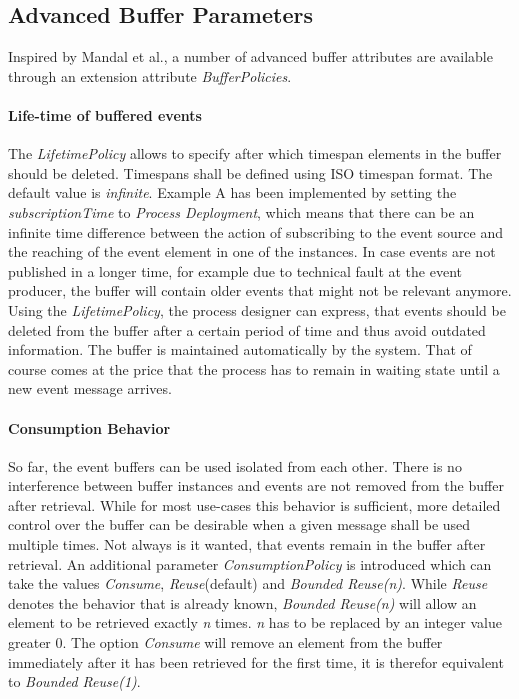 \subsection{Advanced Buffer Parameters}\label{ch:bpmnx:bufferpolicies}
Inspired by Mandal et al., a number of advanced buffer attributes are available through an extension attribute \textit{BufferPolicies}.

\paragraph{Life-time of buffered events\newline}

The \textit{LifetimePolicy} allows to specify after which timespan elements in the buffer should be deleted. Timespans shall be defined using ISO timespan format. 
The default value is \textit{infinite}.
Example A has been implemented by setting the \textit{subscriptionTime} to \textit{Process Deployment}, which means that there can be an infinite time difference between the action of subscribing to the event source and the reaching of the event element in one of the instances. 
In case events are not published in a longer time, for example due to technical fault at the event producer, the buffer will contain older events that might not be relevant anymore.
Using the \textit{LifetimePolicy}, the process designer can express, that events should be deleted from the buffer after a certain period of time and thus avoid outdated information. The buffer is maintained automatically by the system.
That of course comes at the price that the process has to remain in waiting state until a new event message arrives.

\paragraph{Consumption Behavior\newline}

So far, the event buffers can be used isolated from each other. There is no interference between buffer instances and events are not removed from the buffer after retrieval.
While for most use-cases this behavior is sufficient, more detailed control over the buffer can be desirable when a given message shall be used multiple times.
Not always is it wanted, that events remain in the buffer after retrieval.
An additional parameter \textit{ConsumptionPolicy} is introduced which can take the values \textit{Consume}, \textit{Reuse}(default) and \textit{Bounded Reuse(n)}.
While \textit{Reuse} denotes the behavior that is already known, \textit{Bounded Reuse(n)} will allow an element to be retrieved exactly \textit{n} times. \textit{n} has to be replaced by an integer value greater 0.
The option \textit{Consume} will remove an element from the buffer immediately after it has been retrieved for the first time, it is therefor equivalent to \textit{Bounded Reuse(1)}.

